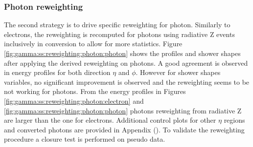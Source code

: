 \subsubsection{Photon reweighting}
The second strategy is to drive specific reweighting for photon. Similarly to electrons, the reweighting is recomputed for photons using radiative Z events inclusively in conversion to allow for more statistics. Figure \ref{fig:gamma:ss:reweighting:photon:photon} shows the profiles and shower shapes after applying the derived reweighting on photons. A good agreement is observed in energy profiles for both direction $\eta$ and $\phi$. However for shower shapes variables, no significant improvement is observed and the reweighting seems to be not working for photons. From the energy profiles in Figures \ref{fig:gamma:ss:reweighting:photon:electron} and \ref{fig:gamma:ss:reweighting:photon:photon} photons reweighting from radiative Z are larger than the one for electrons. Additional control plots for other $\eta$ regions and converted photons are provided in Appendix (). To validate the reweighting procedure a closure test is performed on pseudo data.
